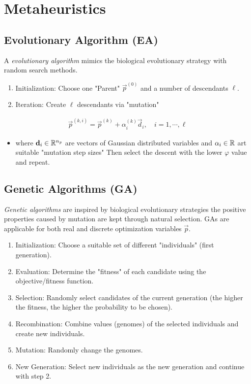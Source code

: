 	\section{Metaheuristics}
		\subsection{Evolutionary Algorithm (EA)}
			A \emph{evolutionary algorithm} mimics the biological evolutionary strategy with random search methods.
			
			\begin{enumerate}
				\item Initialization: \tabto{2.5cm} Choose one "Parent" \( \vec{p}^{(0)} \) and a number of descendants \(\ell\).
				\item Iteration: \tabto{2.5cm} Create \(\ell\) descendants via "mutation"
			\end{enumerate}
			\begin{align*}
				\vec{p}^{(k, i)} = \vec{p}^{(k)} + \alpha_i^{(k)} \vec{d}_i,\quad i = 1, \cdots, \ell
			\end{align*}
			\begin{itemize}
				\item[] where \( \boldsymbol{\mathrm{d}}_i \in \mathbb{R}^{n_p} \) are vectors of Gaussian distributed variables and \( \alpha_i \in \mathbb{R} \) art suitable "mutation step sizes" Then select the descent with the lower \( \varphi \) value and repeat.
			\end{itemize}

		\subsection{Genetic Algorithms (GA)}
			\emph{Genetic algorithms} are inspired by biological evolutionary strategies the positive properties caused by mutation are kept through natural selection. GAs are applicable for both real and discrete optimization variables \(\vec{p}\).
			\begin{enumerate}
				\item Initialization: \tabto{3cm} Choose a suitable set of different "individuals" (first generation).
				\item Evaluation: \tabto{3cm} Determine the "fitness" of each candidate using the objective/fitness function.
				\item Selection: \tabto{3cm} Randomly select candidates of the current generation (the higher the fitness, the higher the probability to be chosen).
				\item Recombination: \tabto{3cm} Combine values (genomes) of the selected individuals and create new individuals.
				\item Mutation: \tabto{3cm} Randomly change the genomes.
				\item New Generation: \tabto{3cm} Select new individuals as the new generation and continue with step 2.
			\end{enumerate}

